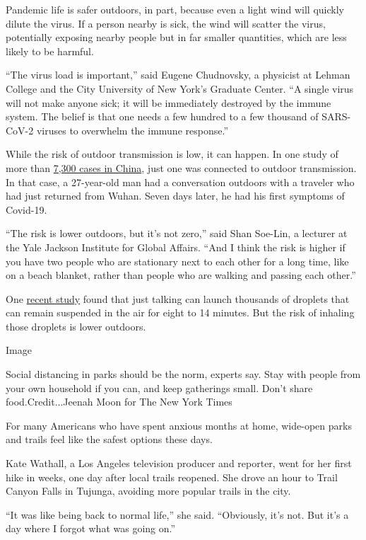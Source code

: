 Pandemic life is safer outdoors, in part, because even a light wind will
quickly dilute the virus. If a person nearby is sick, the wind will
scatter the virus, potentially exposing nearby people but in far smaller
quantities, which are less likely to be harmful.

``The virus load is important,'' said Eugene Chudnovsky, a physicist at
Lehman College and the City University of New York's Graduate Center.
``A single virus will not make anyone sick; it will be immediately
destroyed by the immune system. The belief is that one needs a few
hundred to a few thousand of SARS-CoV-2 viruses to overwhelm the immune
response.''

While the risk of outdoor transmission is low, it can happen. In one
study of more than
\href{https://www.medrxiv.org/content/10.1101/2020.04.04.20053058v1.full.pdf}{7,300
cases in China}, just one was connected to outdoor transmission. In that
case, a 27-year-old man had a conversation outdoors with a traveler who
had just returned from Wuhan. Seven days later, he had his first
symptoms of Covid-19.

``The risk is lower outdoors, but it's not zero,'' said Shan Soe-Lin, a
lecturer at the Yale Jackson Institute for Global Affairs. ``And I think
the risk is higher if you have two people who are stationary next to
each other for a long time, like on a beach blanket, rather than people
who are walking and passing each other.''

One
\href{https://www.nytimes3xbfgragh.onion/2020/05/14/health/coronavirus-infections.html}{recent
study} found that just talking can launch thousands of droplets that can
remain suspended in the air for eight to 14 minutes. But the risk of
inhaling those droplets is lower outdoors.

Image

Social distancing in parks should be the norm, experts say. Stay with
people from your own household if you can, and keep gatherings small.
Don't share food.Credit...Jeenah Moon for The New York Times

For many Americans who have spent anxious months at home, wide-open
parks and trails feel like the safest options these days.

Kate Wathall, a Los Angeles television producer and reporter, went for
her first hike in weeks, one day after local trails reopened. She drove
an hour to Trail Canyon Falls in Tujunga, avoiding more popular trails
in the city.

``It was like being back to normal life,'' she said. ``Obviously, it's
not. But it's a day where I forgot what was going on.''

